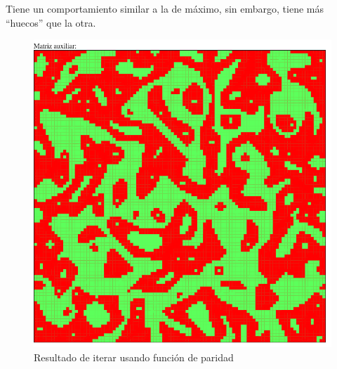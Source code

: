 	Tiene un comportamiento similar a la de máximo, sin embargo, tiene más ``huecos'' que la otra.
	\begin{figure}[H]
		\begin{center}
			\includegraphics[scale=.3]{GOLM/img/regla2746-3.png}
			\caption{Resultado de iterar usando función de paridad}
			\label{fig:golm6}
		\end{center}
	\end{figure}

